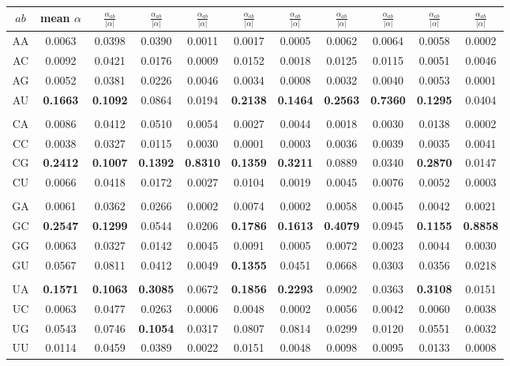 \begin{table}
\begin{center}
\begin{tabular}{|c|c|c|c|c|c|c|c|c|c|c|}
$ab$ & mean $\alpha$ & $\frac{\alpha_{ab}}{|\alpha|}$ & $\frac{\alpha_{ab}}{|\alpha|}$ & $\frac{\alpha_{ab}}{|\alpha|}$ & $\frac{\alpha_{ab}}{|\alpha|}$ & $\frac{\alpha_{ab}}{|\alpha|}$ & $\frac{\alpha_{ab}}{|\alpha|}$ & $\frac{\alpha_{ab}}{|\alpha|}$ & $\frac{\alpha_{ab}}{|\alpha|}$ & $\frac{\alpha_{ab}}{|\alpha|}$ \\ \hline 
AA & 0.0063 & 0.0398 & 0.0390 & 0.0011 & 0.0017 & 0.0005 & 0.0062 & 0.0064 & 0.0058 & 0.0002 \\  
AC & 0.0092 & 0.0421 & 0.0176 & 0.0009 & 0.0152 & 0.0018 & 0.0125 & 0.0115 & 0.0051 & 0.0046 \\  
AG & 0.0052 & 0.0381 & 0.0226 & 0.0046 & 0.0034 & 0.0008 & 0.0032 & 0.0040 & 0.0053 & 0.0001 \\  
AU & \textbf{0.1663} & \textbf{0.1092} & 0.0864 & 0.0194 & \textbf{0.2138} & \textbf{0.1464} & \textbf{0.2563} & \textbf{0.7360} & \textbf{0.1295} & 0.0404 \\  
& & & & & & & & & & \\
CA & 0.0086 & 0.0412 & 0.0510 & 0.0054 & 0.0027 & 0.0044 & 0.0018 & 0.0030 & 0.0138 & 0.0002 \\  
CC & 0.0038 & 0.0327 & 0.0115 & 0.0030 & 0.0001 & 0.0003 & 0.0036 & 0.0039 & 0.0035 & 0.0041 \\  
CG & \textbf{0.2412} & \textbf{0.1007} & \textbf{0.1392} & \textbf{0.8310} & \textbf{0.1359} & \textbf{0.3211} & 0.0889 & 0.0340 & \textbf{0.2870} & 0.0147 \\  
CU & 0.0066 & 0.0418 & 0.0172 & 0.0027 & 0.0104 & 0.0019 & 0.0045 & 0.0076 & 0.0052 & 0.0003 \\  
& & & & & & & & & & \\
GA & 0.0061 & 0.0362 & 0.0266 & 0.0002 & 0.0074 & 0.0002 & 0.0058 & 0.0045 & 0.0042 & 0.0021 \\  
GC & \textbf{0.2547} & \textbf{0.1299} & 0.0544 & 0.0206 & \textbf{0.1786} & \textbf{0.1613} & \textbf{0.4079} & 0.0945 & \textbf{0.1155} & \textbf{0.8858} \\  
GG & 0.0063 & 0.0327 & 0.0142 & 0.0045 & 0.0091 & 0.0005 & 0.0072 & 0.0023 & 0.0044 & 0.0030 \\  
GU & 0.0567 & 0.0811 & 0.0412 & 0.0049 & \textbf{0.1355} & 0.0451 & 0.0668 & 0.0303 & 0.0356 & 0.0218 \\  
& & & & & & & & & & \\
UA & \textbf{0.1571} & \textbf{0.1063} & \textbf{0.3085} & 0.0672 & \textbf{0.1856} & \textbf{0.2293} & 0.0902 & 0.0363 & \textbf{0.3108} & 0.0151 \\  
UC & 0.0063 & 0.0477 & 0.0263 & 0.0006 & 0.0048 & 0.0002 & 0.0056 & 0.0042 & 0.0060 & 0.0038 \\  
UG & 0.0543 & 0.0746 & \textbf{0.1054} & 0.0317 & 0.0807 & 0.0814 & 0.0299 & 0.0120 & 0.0551 & 0.0032 \\  
UU & 0.0114 & 0.0459 & 0.0389 & 0.0022 & 0.0151 & 0.0048 & 0.0098 & 0.0095 & 0.0133 & 0.0008 \\ \hline 
\end{tabular}
\end{center}


\end{table}
